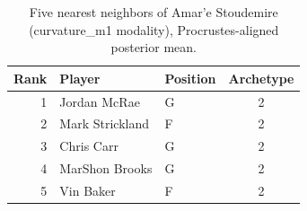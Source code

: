 \begin{table}[htbp]
  \centering\small
  \begin{tabular}{rllc}
    \toprule
    Rank & Player & Position & Archetype \\
    \midrule
    1 & Jordan McRae & G & 2 \\
    2 & Mark Strickland & F & 2 \\
    3 & Chris Carr & G & 2 \\
    4 & MarShon Brooks & G & 2 \\
    5 & Vin Baker & F & 2 \\
    \bottomrule
  \end{tabular}
  \caption{Five nearest neighbors of Amar'e Stoudemire (curvature_m1 modality), Procrustes-aligned posterior mean.}
  \label{tab:Amar_e_Stoudemire_neighbors_curvature_m1}
\end{table}

